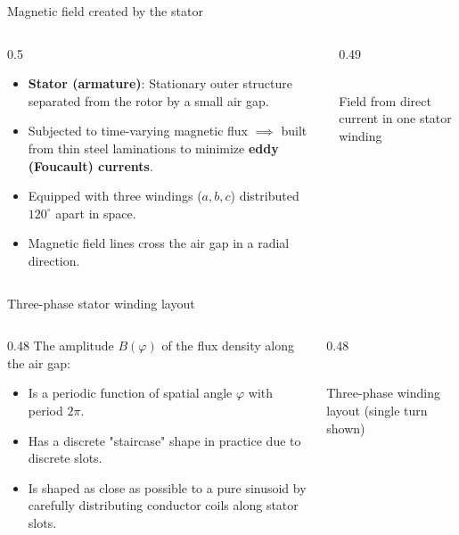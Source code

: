 \begin{frame}{Magnetic field created by the stator}
  \begin{columns}
    \begin{column}{0.5\textwidth}
      \begin{itemize}
        \item \textbf{Stator (armature)}: Stationary outer structure separated from the rotor by a small air gap.
        \item Subjected to time-varying magnetic flux $\implies$ built from thin steel laminations to minimize \textbf{eddy (Foucault) currents}.
        \item Equipped with three windings ($a, b, c$) distributed $120^\circ$ apart in space.
        \item Magnetic field lines cross the air gap in a radial direction.
      \end{itemize}
    \end{column}
    \begin{column}{0.49\textwidth}
      \begin{center}
        \resizebox{\linewidth}{!}{}\\
        \vspace{0.1cm}
        \tiny Field from direct current in one stator winding
      \end{center}
    \end{column}
  \end{columns}
\end{frame}

\begin{frame}{Three-phase stator winding layout}
  \begin{columns}
    \begin{column}{0.48\textwidth}
      The amplitude $B(\varphi)$ of the flux density along the air gap:
      \begin{itemize}
        \item Is a periodic function of spatial angle $\varphi$ with period $2\pi$.
        \item Has a discrete "staircase" shape in practice due to discrete slots.
        \item Is shaped as close as possible to a pure sinusoid by carefully distributing conductor coils along stator slots.
      \end{itemize}
    \end{column}
    \begin{column}{0.48\textwidth}
      \begin{center}
        \resizebox{\linewidth}{!}{}\\
        \vspace{0.1cm}
        \tiny Three-phase winding layout (single turn shown)
      \end{center}
    \end{column}
  \end{columns}
\end{frame}


